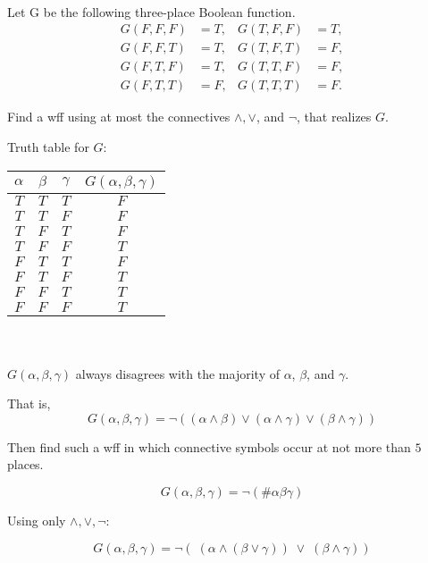 \documentclass[english, 11pt, a4paper, twoside, openright, oldfontcommands]{amsart}
\newcounter{problem}
\begin{document}
\\
\begin{problem}
  Let G be the following three-place Boolean function.
  \begin{align*}
    G(F, F, F) &= T,&
    G(T, F, F) &= T,\\
    G(F, F, T) &= T,&
    G(T, F, T) &= F,\\
    G(F, T, F) &= T,&
    G(T, T, F) &= F,\\
    G(F, T, T) &= F,&
    G(T, T, T) &= F.
  \end{align*}
  \begin{enumalph}
    \item Find a wff using at most the connectives $\land, \lor$, and $\lnot$,
      that realizes $G$.
      \begin{Answer}
        Truth table for $G$:

        \begin{tabular}{ c c c c }
          $\alpha$ & $\beta$ & $\gamma$ & $G(\alpha, \beta, \gamma)$ \\
          \bottomrule
          $T$ & $T$ & $T$ & $F$ \\
          \midrule
          $T$ & $T$ & $F$ & $F$ \\
          \midrule
          $T$ & $F$ & $T$ & $F$ \\
          \midrule
          $T$ & $F$ & $F$ & $T$ \\
          \midrule
          $F$ & $T$ & $T$ & $F$ \\
          \midrule
          $F$ & $T$ & $F$ & $T$ \\
          \midrule
          $F$ & $F$ & $T$ & $T$ \\
          \midrule
          $F$ & $F$ & $F$ & $T$ \\
          \toprule
        \end{tabular}
        \\ \\
        $G(\alpha, \beta, \gamma)$ always disagrees with the majority
        of $\alpha$, $\beta$, and $\gamma$.
        
        \noindent
        That is, 
        \[ 
          G(\alpha, \beta, \gamma ) = 
            \lnot (
              (\alpha \land \beta ) \lor (\alpha \land \gamma )
              \lor (\beta \land \gamma )
            )
        \]

      \end{Answer}
    \item Then find such a wff in which connective symbols occur at not more than $5$ places.
      \begin{Answer}
        \[ G(\alpha, \beta, \gamma) = \lnot(\# \alpha \beta \gamma)\]

        Using only $\land, \lor, \lnot$:

        \[ G(\alpha, \beta, \gamma) = \lnot(\;(\alpha \land (\beta \lor \gamma))\; \lor \; (\beta \land \gamma))\]
      \end{Answer}
  \end{enumalph}
\end{problem}
\bigskip
\end{document}
